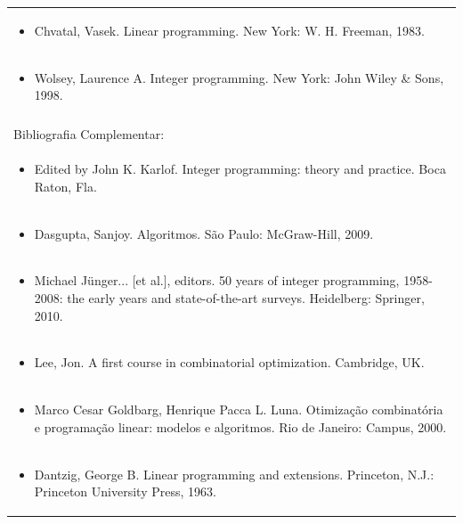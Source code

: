 \documentclass[11pt]{article}
\begin{document}
\begin{center}
\begin{longtable}{|p{4cm}|p{4cm}|p{4cm}|p{4cm}|}
\multicolumn{4}{|p{\dimexpr 16cm + 6\tabcolsep\relax}|}{\begin{itemize}\item Chvatal, Vasek. Linear programming. New York: W. H. Freeman, 1983.\end{itemize}}\\
\multicolumn{4}{|p{\dimexpr 16cm + 6\tabcolsep\relax}|}{\begin{itemize}\item Wolsey, Laurence A. Integer programming. New York: John Wiley \& Sons, 1998.\end{itemize}}\\
\multicolumn{4}{|p{16cm}|}{}\\
\hline
\multicolumn{4}{|p{16cm}|}{Bibliografia Complementar:}\\*
\multicolumn{4}{|p{\dimexpr 16cm + 6\tabcolsep\relax}|}{\begin{itemize}\item Edited by John K. Karlof. Integer programming: theory and practice. Boca Raton, Fla.\end{itemize}}\\
\multicolumn{4}{|p{\dimexpr 16cm + 6\tabcolsep\relax}|}{\begin{itemize}\item Dasgupta, Sanjoy. Algoritmos. São Paulo: McGraw-Hill, 2009.\end{itemize}}\\
\multicolumn{4}{|p{\dimexpr 16cm + 6\tabcolsep\relax}|}{\begin{itemize}\item Michael Jünger... [et al.], editors. 50 years of integer programming, 1958-2008: the early years and state-of-the-art surveys. Heidelberg: Springer, 2010.\end{itemize}}\\
\multicolumn{4}{|p{\dimexpr 16cm + 6\tabcolsep\relax}|}{\begin{itemize}\item Lee, Jon. A first course in combinatorial optimization. Cambridge, UK.\end{itemize}}\\
\multicolumn{4}{|p{\dimexpr 16cm + 6\tabcolsep\relax}|}{\begin{itemize}\item Marco Cesar Goldbarg, Henrique Pacca L. Luna. Otimização combinatória e programação linear: modelos e algoritmos. Rio de Janeiro: Campus, 2000.\end{itemize}}\\
\multicolumn{4}{|p{\dimexpr 16cm + 6\tabcolsep\relax}|}{\begin{itemize}\item Dantzig, George B. Linear programming and extensions. Princeton, N.J.: Princeton University Press, 1963.\end{itemize}}\\
\hline
\end{longtable}
\end{center}
\end{document}
